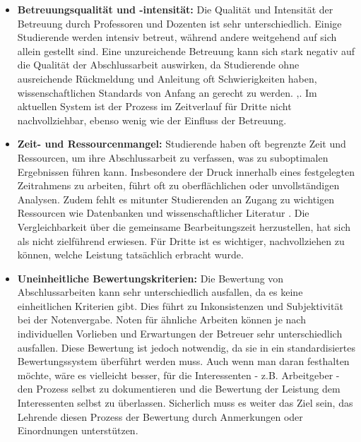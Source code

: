 \documentclass[conference]{IEEEtran}
\begin{document}
\begin{itemize}[leftmargin=*]
    \item \textbf{Betreuungsqualität und -intensität:}
    \newline Die Qualität und Intensität der Betreuung durch Professoren und Dozenten ist sehr unterschiedlich. Einige Studierende werden intensiv betreut, während andere weitgehend auf sich allein gestellt sind. Eine unzureichende Betreuung kann sich stark negativ auf die Qualität der Abschlussarbeit auswirken, da Studierende ohne ausreichende Rückmeldung und Anleitung oft Schwierigkeiten haben, wissenschaftlichen Standards von Anfang an gerecht zu werden. \cite{betreuungsleistung2023},\cite{ghadirian2014}.  Im aktuellen System ist der Prozess im Zeitverlauf für Dritte nicht nachvollziehbar, ebenso wenig wie der Einfluss der Betreuung. 

    \item \textbf{Zeit- und Ressourcenmangel:}
    \newline Studierende haben oft begrenzte Zeit und Ressourcen, um ihre Abschlussarbeit zu verfassen, was zu suboptimalen Ergebnissen führen kann. Insbesondere der Druck innerhalb eines festgelegten Zeitrahmens zu arbeiten, führt oft zu oberflächlichen oder unvollständigen Analysen. Zudem fehlt es mitunter Studierenden an Zugang zu wichtigen Ressourcen wie Datenbanken und wissenschaftlicher Literatur \cite{Rabab}. Die Vergleichbarkeit über die gemeinsame Bearbeitungszeit herzustellen, hat sich als nicht zielführend erwiesen. Für Dritte ist es wichtiger, nachvollziehen zu können, welche Leistung tatsächlich erbracht wurde. 

    \item \textbf{Uneinheitliche Bewertungskriterien:}
    \newline Die Bewertung von Abschlussarbeiten kann sehr unterschiedlich ausfallen, da es keine einheitlichen Kriterien gibt. Dies führt zu Inkonsistenzen und Subjektivität bei der Notenvergabe. Noten für ähnliche Arbeiten können je nach individuellen Vorlieben und Erwartungen der Betreuer sehr unterschiedlich ausfallen. Diese Bewertung ist jedoch notwendig, da sie in ein standardisiertes Bewertungssystem überführt werden muss. Auch wenn man daran festhalten möchte, wäre es vielleicht besser, für die Interessenten - z.B. Arbeitgeber - den Prozess selbst zu dokumentieren und die Bewertung der Leistung dem Interessenten selbst zu überlassen. Sicherlich muss es weiter das Ziel sein, das Lehrende diesen Prozess der Bewertung durch Anmerkungen oder Einordnungen unterstützen. 


\end{itemize}
\end{document}
